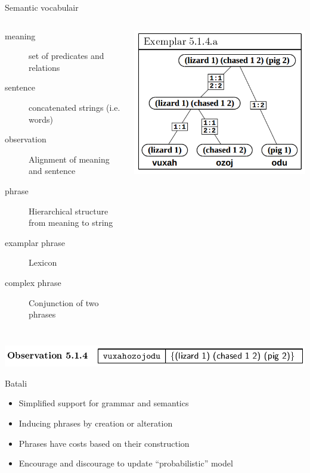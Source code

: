 \documentclass[11pt,a4paper,xcolor=dvipsnames]{beamer}
\begin{document}
\begin{frame}{Semantic vocabulair}
  \begin{columns}[c]
      \begin{description}
        \item[meaning] set of predicates and relations
        \item[sentence] concatenated strings (i.e. words)
        \item[observation] Alignment of meaning and sentence
        \item[phrase] Hierarchical structure from meaning to string
        \item[examplar phrase] Lexicon
        \item[complex phrase] Conjunction of two phrases
      \end{description}
      \includegraphics[scale=0.2]{assets/examplar514a.png}
  \end{columns}
  \hfill \includegraphics[scale=0.2]{assets/observation514.png}
\end{frame}

\begin{frame}{Batali}
  \begin{itemize}
    \item Simplified support for grammar and semantics
    \item Inducing phrases by creation or alteration
    \item Phrases have costs based on their construction
    \item Encourage and discourage to update ``probabilistic'' model
  \end{itemize}
\end{frame}
\end{document}
